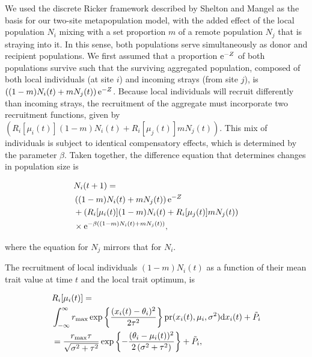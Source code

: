 \documentclass{revtex4}
\begin{document}
We used the discrete Ricker framework described by Shelton and Mangel \citep{Shelton:2011eq} as the basis for our two-site metapopulation model, with the added effect of the local population $N_i$ mixing with a set proportion $m$ of a remote population $N_j$ that is straying into it.
In this sense, both populations serve simultaneously as donor and recipient populations.
We first assumed that a proportion ${\rm e}^{-Z}$ of both populations survive such that the surviving aggregated population, composed of both local individuals (at site $i$) and incoming strays (from site $j$), is $\left((1-m)N_i(t) + m N_j(t) \right){\rm e}^{-Z}$.
Because local individuals will recruit differently than incoming strays, the recruitment of the aggregate must incorporate two recruitment functions, given by $\left(R_i[\mu_i(t)] (1-m)N_i(t) + R_i[\mu_j(t)] m N_j(t)\right)$.
This mix of individuals is subject to identical compensatory effects, which is determined by the parameter $\beta$.
Taken together, the difference equation that determines changes in population size is

\begin{align}
  &N_i(t+1) = \\ \nonumber
  &\left((1-m)N_i(t) + m N_j(t) \right){\rm e}^{-Z} \\ \nonumber
  &+ \left(R_i[\mu_i(t)] (1-m)N_i(t) + R_i[\mu_j(t)] m N_j(t)\right) \\ \nonumber
  &\times {\rm e}^{-\beta ((1-m)N_i(t) + m N_j(t))},
  \label{eq:N}
\end{align}

\noindent where the equation for $N_j$ mirrors that for $N_i$.

The recruitment of local individuals $(1-m)N_i(t)$ as a function of their mean trait value at time $t$ and the local trait optimum, is

\begin{align}
  &R_i[\mu_i(t)] = \\ \nonumber
  &\int_{-\infty}^\infty r_{\rm max}\exp\left\{\frac{(x_i(t)-\theta_i)^2}{2\tau^2}\right\} {\rm pr}(x_i(t),\mu_i,\sigma^2) {\rm d}x_i(t) +\tilde{P}_i\\ \nonumber
  &= \frac{r_{\rm max} \tau  }{\sqrt{\sigma ^2+\tau ^2}}\exp\left\{-\frac{(\theta_i-\mu_i(t))^2}{2 \left(\sigma ^2+\tau ^2\right)}\right\} +\tilde{P}_i,
  \label{eq:R}
\end{align}
\end{document}
